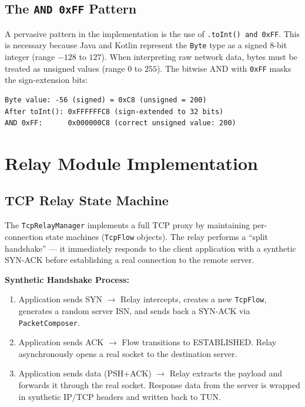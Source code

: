 \subsection{The \texttt{AND 0xFF} Pattern}

A pervasive pattern in the implementation is the use of \texttt{.toInt() and 0xFF}. This is necessary because Java and Kotlin represent the \texttt{Byte} type as a signed 8-bit integer (range $-128$ to $127$). When interpreting raw network data, bytes must be treated as unsigned values (range $0$ to $255$). The bitwise AND with \texttt{0xFF} masks the sign-extension bits:

\begin{verbatim}
Byte value: -56 (signed) = 0xC8 (unsigned = 200)
After toInt(): 0xFFFFFFC8 (sign-extended to 32 bits)
AND 0xFF:      0x000000C8 (correct unsigned value: 200)
\end{verbatim}


\section{Relay Module Implementation}
\label{sec:relay_impl}

\subsection{TCP Relay State Machine}

The \texttt{TcpRelayManager} implements a full TCP proxy by maintaining per-connection state machines (\texttt{TcpFlow} objects). The relay performs a ``split handshake'' --- it immediately responds to the client application with a synthetic SYN-ACK before establishing a real connection to the remote server.

\textbf{Synthetic Handshake Process:}
\begin{enumerate}
    \item Application sends SYN $\rightarrow$ Relay intercepts, creates a new \texttt{TcpFlow}, generates a random server ISN, and sends back a SYN-ACK via \texttt{PacketComposer}.
    \item Application sends ACK $\rightarrow$ Flow transitions to ESTABLISHED. Relay asynchronously opens a real socket to the destination server.
    \item Application sends data (PSH+ACK) $\rightarrow$ Relay extracts the payload and forwards it through the real socket. Response data from the server is wrapped in synthetic IP/TCP headers and written back to TUN.
\end{enumerate}

